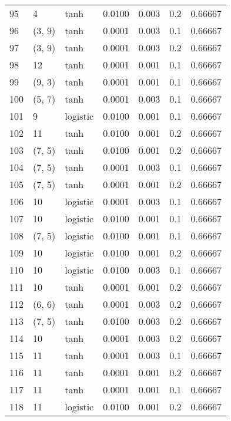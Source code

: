 \begin{tabular}{lllrrrr}
95  &           4 &      tanh &  0.0100 &  0.003 &  0.2 &   0.66667 \\
96  &      (3, 9) &      tanh &  0.0001 &  0.003 &  0.1 &   0.66667 \\
97  &      (3, 9) &      tanh &  0.0001 &  0.003 &  0.2 &   0.66667 \\
98  &          12 &      tanh &  0.0001 &  0.001 &  0.1 &   0.66667 \\
99  &      (9, 3) &      tanh &  0.0001 &  0.001 &  0.1 &   0.66667 \\
100 &      (5, 7) &      tanh &  0.0001 &  0.003 &  0.1 &   0.66667 \\
101 &           9 &  logistic &  0.0100 &  0.001 &  0.1 &   0.66667 \\
102 &          11 &      tanh &  0.0100 &  0.001 &  0.2 &   0.66667 \\
103 &      (7, 5) &      tanh &  0.0100 &  0.001 &  0.2 &   0.66667 \\
104 &      (7, 5) &      tanh &  0.0001 &  0.003 &  0.1 &   0.66667 \\
105 &      (7, 5) &      tanh &  0.0001 &  0.001 &  0.2 &   0.66667 \\
106 &          10 &  logistic &  0.0001 &  0.003 &  0.1 &   0.66667 \\
107 &          10 &  logistic &  0.0100 &  0.001 &  0.1 &   0.66667 \\
108 &      (7, 5) &  logistic &  0.0100 &  0.001 &  0.1 &   0.66667 \\
109 &          10 &  logistic &  0.0100 &  0.001 &  0.2 &   0.66667 \\
110 &          10 &  logistic &  0.0100 &  0.003 &  0.1 &   0.66667 \\
111 &          10 &      tanh &  0.0001 &  0.001 &  0.2 &   0.66667 \\
112 &      (6, 6) &      tanh &  0.0001 &  0.003 &  0.2 &   0.66667 \\
113 &      (7, 5) &      tanh &  0.0100 &  0.003 &  0.2 &   0.66667 \\
114 &          10 &      tanh &  0.0001 &  0.003 &  0.2 &   0.66667 \\
115 &          11 &      tanh &  0.0001 &  0.003 &  0.1 &   0.66667 \\
116 &          11 &      tanh &  0.0001 &  0.001 &  0.2 &   0.66667 \\
117 &          11 &      tanh &  0.0001 &  0.001 &  0.1 &   0.66667 \\
118 &          11 &  logistic &  0.0100 &  0.001 &  0.2 &   0.66667 \\

\end{tabular}
